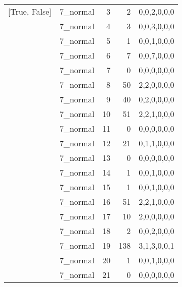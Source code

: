 \begin{tabular}{llrrl}
 [True, False]   & 7\_normal            &             3 &                     2 & 0,0,2,0,0,0   \\
 [True, False]   & 7\_normal            &             4 &                     3 & 0,0,3,0,0,0   \\
 [True, False]   & 7\_normal            &             5 &                     1 & 0,0,1,0,0,0   \\
 [True, False]   & 7\_normal            &             6 &                     7 & 0,0,7,0,0,0   \\
 [True, False]   & 7\_normal            &             7 &                     0 & 0,0,0,0,0,0   \\
 [True, False]   & 7\_normal            &             8 &                    50 & 2,2,0,0,0,0   \\
 [True, False]   & 7\_normal            &             9 &                    40 & 0,2,0,0,0,0   \\
 [True, False]   & 7\_normal            &            10 &                    51 & 2,2,1,0,0,0   \\
 [True, False]   & 7\_normal            &            11 &                     0 & 0,0,0,0,0,0   \\
 [True, False]   & 7\_normal            &            12 &                    21 & 0,1,1,0,0,0   \\
 [True, False]   & 7\_normal            &            13 &                     0 & 0,0,0,0,0,0   \\
 [True, False]   & 7\_normal            &            14 &                     1 & 0,0,1,0,0,0   \\
 [True, False]   & 7\_normal            &            15 &                     1 & 0,0,1,0,0,0   \\
 [True, False]   & 7\_normal            &            16 &                    51 & 2,2,1,0,0,0   \\
 [True, False]   & 7\_normal            &            17 &                    10 & 2,0,0,0,0,0   \\
 [True, False]   & 7\_normal            &            18 &                     2 & 0,0,2,0,0,0   \\
 [True, False]   & 7\_normal            &            19 &                   138 & 3,1,3,0,0,1   \\
 [True, False]   & 7\_normal            &            20 &                     1 & 0,0,1,0,0,0   \\
 [True, False]   & 7\_normal            &            21 &                     0 & 0,0,0,0,0,0   \\

\end{tabular}
